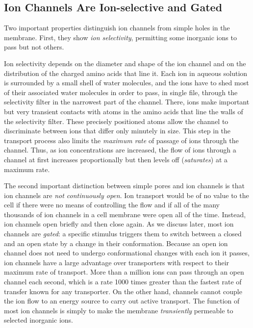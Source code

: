 \subsection{Ion Channels Are Ion-selective and Gated}

Two important properties distinguish ion channels from simple holes in
the membrane. First, they show \textit{ion selectivity}, permitting some inorganic
ions to pass but not others. 

Ion selectivity depends on the diameter and
shape of the ion channel and on the distribution of the charged amino acids that line it.
Each ion in aqueous solution is surrounded by a small shell of water molecules,
and the ions have to shed most of their associated water molecules in
order to pass, in single file, through the selectivity filter in the narrowest
part of the channel. There, ions make important but very transient contacts
with atoms in the amino acids that line the walls of the selectivity
filter. These precisely positioned atoms allow the channel
to discriminate between ions that differ only minutely in size. This
step in the transport process also limits the \textit{maximum rate} of passage of
ions through the channel. Thus, as ion concentrations are increased, the
flow of ions through a channel at first increases proportionally but then
levels off (\textit{saturates}) at a maximum rate.

The second important distinction between simple pores and ion channels
is that ion channels are \textit{not continuously open}. Ion transport would be of
no value to the cell if there were no means of controlling the flow and if
all of the many thousands of ion channels in a cell membrane were open
all of the time. Instead, ion channels open briefly and then close again.
As we discuss later, most ion channels are \textit{gated}: a specific
stimulus triggers them to switch between a closed and an open state
by a change in their conformation.
Because an open ion channel does not need to undergo conformational
changes with each ion it passes, ion channels have a large advantage
over transporters with respect to their maximum rate of transport. More
than a million ions can pass through an open channel each second, which
is a rate 1000 times greater than the fastest rate of transfer known for
any transporter. On the other hand, channels cannot couple the ion flow
to an energy source to carry out active transport. The function of most
ion channels is simply to make the membrane \textit{transiently} permeable to
selected inorganic ions.

